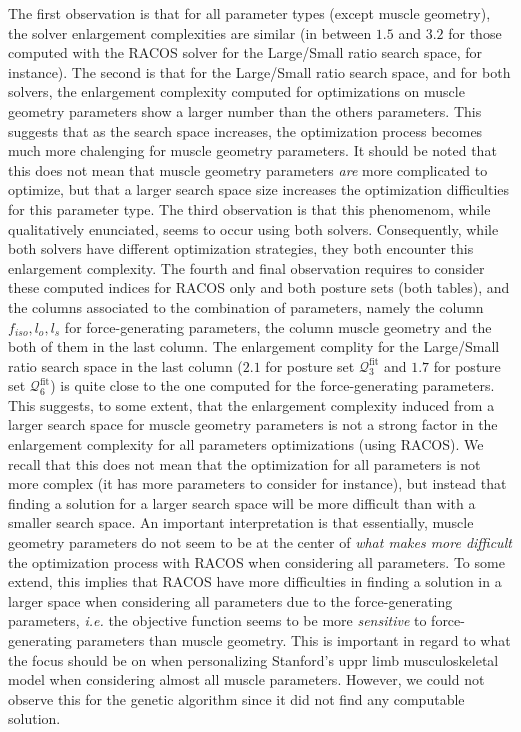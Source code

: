The first observation is that for all parameter types (except muscle geometry), the solver enlargement complexities are similar (in between $1.5$ and $3.2$ for those computed with the RACOS solver for the Large/Small ratio search space, for instance). The second is that for the Large/Small ratio search space, and for both solvers, the enlargement complexity computed for optimizations on muscle geometry parameters show a larger number than the others parameters. This suggests that as the search space increases, the optimization process becomes much more chalenging for muscle geometry parameters. It should be noted that this does not mean that muscle geometry parameters \emph{are} more complicated to optimize, but that a larger search space size increases the optimization difficulties for this parameter type. The third observation is that this phenomenom, while qualitatively enunciated, seems to occur using both solvers. Consequently, while both solvers have different optimization strategies, they both encounter this enlargement complexity. The fourth and final observation requires to consider these computed indices for RACOS only and both posture sets (both tables), and the columns associated to the combination of parameters, namely the column $f_{iso}, l_o, l_s$ for force-generating parameters, the column muscle geometry and the both of them in the last column. The enlargement complity for the Large/Small ratio search space in the last column ($2.1$ for posture set $\mathcal{Q}_3^{\text{fit}}$ and $1.7$ for posture set $\mathcal{Q}_6^{\text{fit}}$) is quite close to the one computed for the force-generating parameters. This suggests, to some extent, that the enlargement complexity induced from a larger search space for muscle geometry parameters is not a strong factor in the enlargement complexity for all parameters optimizations (using RACOS). We recall that this does not mean that the optimization for all parameters is not more complex (it has more parameters to consider for instance), but instead that finding a solution for a larger search space will be more difficult than with a smaller search space. An important interpretation is that essentially, muscle geometry parameters do not seem to be at the center of \emph{what makes more difficult} the optimization process with RACOS when considering all parameters. To some extend, this implies that RACOS have more difficulties in finding a solution in a larger space when considering all parameters due to the force-generating parameters, \emph{i.e.} the objective function seems to be more \emph{sensitive} to force-generating parameters than muscle geometry. This is important in regard to what the focus should be on when personalizing Stanford's uppr limb musculoskeletal model when considering almost all muscle parameters.
However, we could not observe this for the genetic algorithm since it did not find any computable solution.

